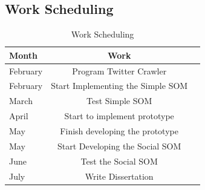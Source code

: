 \subsection{Work Scheduling} %
\label{sub:work_scheduling}
\begin{table}[tb]
  \caption{Work Scheduling}
  \label{tab:tablename}
  \begin{center}
    \begin{tabular}{l|cc}
    \hline

    \hline
    \textbf{Month} & \textbf{Work} \\
    \hline
      February & Program Twitter Crawler\\
    \hline
      February & Start Implementing the Simple SOM\\
    \hline
      March & Test Simple SOM  \\
    \hline
      April & Start to implement prototype  \\
    \hline
      May & Finish developing the prototype  \\
    \hline
      May & Start Developing the Social SOM  \\
    \hline
      June & Test the Social SOM  \\
    \hline
      July & Write Dissertation  \\
    \hline

    \hline
    \end{tabular}
  \end{center}
\end{table}



